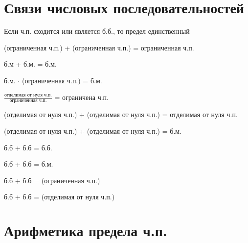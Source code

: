 \section{Связи числовых последовательностей}


\nt
{
    Если ч.п. сходится или является б.б., то предел единственный
}

{
    (ограниченная ч.п.) + (ограниченная ч.п.) = ограниченная ч.п.

    б.м + б.м. = б.м.

    б.м. $\cdot$ (ограниченная ч.п.) = б.м.

    $\frac{\text{отделимая от нуля ч.п.}}{\text{ограниченная ч.п.}}$ = ограничена ч.п.
}

{
    (отделимая от нуля ч.п.) + (отделимая от нуля ч.п.) = отделимая от нуля ч.п.

    (отделимая от нуля ч.п.) + (отделимая от нуля ч.п.) = б.м.

    б.б + б.б = б.б.

    б.б + б.б = б.м.

    б.б + б.б = (ограниченная ч.п.)

    б.б + б.б = (отделимая от нуля ч.п.)
}

\pagebreak
\section{Арифметика предела ч.п.}


